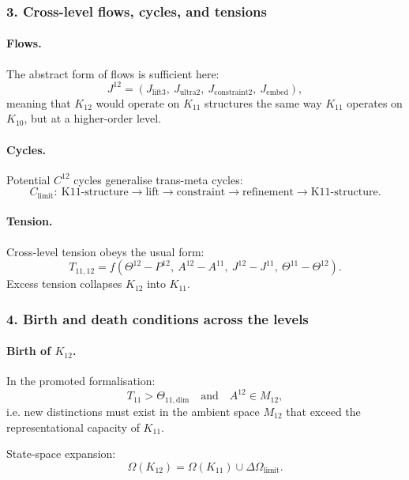 \subsubsection{3. Cross-level flows, cycles, and tensions}

\paragraph{Flows.}
The abstract form of flows is sufficient here:
\[
J^{12} = (J_{\mathrm{lift3}},\ J_{\mathrm{ultra2}},\
          J_{\mathrm{constraint2}},\ J_{\mathrm{embed}}),
\]
meaning that $K_{12}$ would operate on $K_{11}$ structures the same way
$K_{11}$ operates on $K_{10}$, but at a higher-order level.

\paragraph{Cycles.}
Potential $C^{12}$ cycles generalise trans-meta cycles:
\[
C_{\mathrm{limit}}:\
\text{K11-structure} \rightarrow \text{lift} \rightarrow
\text{constraint} \rightarrow \text{refinement} \rightarrow \text{K11-structure}.
\]

\paragraph{Tension.}
Cross-level tension obeys the usual form:
\[
T_{11,12} =
f(\Theta^{12} - P^{12},\ A^{12} - A^{11},\
  J^{12} - J^{11},\ \Theta^{11} - \Theta^{12}).
\]
Excess tension collapses $K_{12}$ into $K_{11}$.

\subsubsection{4. Birth and death conditions across the levels}

\paragraph{Birth of $K_{12}$.}
In the promoted formalisation:
\[
T_{11} > \Theta_{11,\mathrm{dim}}
\quad\text{and}\quad
A^{12} \in M_{12},
\]
i.e. new distinctions must exist in the ambient space $M_{12}$ that exceed
the representational capacity of $K_{11}$.

State-space expansion:
\[
\Omega(K_{12}) = \Omega(K_{11}) \cup \Delta\Omega_{\mathrm{limit}}.
\]


